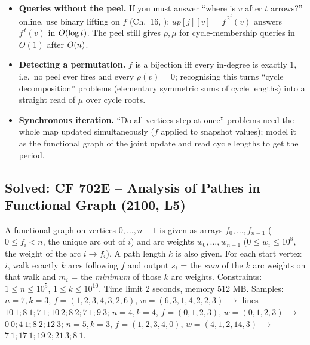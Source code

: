 \begin{hardeningbox}
\begin{itemize}[nosep,leftmargin=1.4em]
  \item \textbf{Queries without the peel.} If you must answer ``where is \(v\) after
        \(t\) arrows?'' online, use binary lifting on \(f\) (Ch.~16, ):
        \(\mathit{up}[j][v]=f^{\,2^j}(v)\) answers \(f^{\,t}(v)\) in
        \(O(\log t)\).  The peel still gives \(\rho,\mu\) for cycle-membership
        queries in \(O(1)\) after \(O(n)\).
  \item \textbf{Detecting a permutation.} \(f\) is a bijection iff every in-degree is
        exactly \(1\), i.e.\ no peel ever fires and every \(\rho(v)=0\); recognising
        this turns ``cycle decomposition'' problems (elementary symmetric sums of
        cycle lengths) into a straight read of \(\mu\) over cycle roots.
  \item \textbf{Synchronous iteration.} ``Do all vertices step at once'' problems need
        the whole map updated simultaneously (\(f\) applied to snapshot values); model
        it as the functional graph of the joint update and read cycle lengths to get
        the period.
\end{itemize}
\end{hardeningbox}

\subsection{Solved: CF 702E -- Analysis of Pathes in Functional Graph (2100, L5)}


\begin{problemstatement}
A functional graph on vertices \(0,\dots,n-1\) is given as arrays \(f_0,\dots,f_{n-1}\)
(\(0\le f_i<n\), the unique arc out of \(i\)) and arc weights \(w_0,\dots,w_{n-1}\)
(\(0\le w_i\le 10^8\), the weight of the arc \(i\to f_i\)).  A path length \(k\) is
also given.  For each start vertex \(i\), walk exactly \(k\) arcs following \(f\) and
output \(s_i\) = the \emph{sum} of the \(k\) arc weights on that walk and \(m_i\) =
the \emph{minimum} of those \(k\) arc weights.  Constraints: \(1\le n\le 10^5\),
\(1\le k\le 10^{10}\).  Time limit 2 seconds, memory 512 MB.  Samples:
\(n{=}7,k{=}3\), \(f=(1,2,3,4,3,2,6)\), \(w=(6,3,1,4,2,2,3)\) \(\to\) lines
\(10\ 1; 8\ 1; 7\ 1; 10\ 2; 8\ 2; 7\ 1; 9\ 3\); \(n{=}4,k{=}4\),
\(f=(0,1,2,3)\), \(w=(0,1,2,3)\) \(\to\) \(0\ 0; 4\ 1; 8\ 2; 12\ 3\);
\(n{=}5,k{=}3\), \(f=(1,2,3,4,0)\), \(w=(4,1,2,14,3)\) \(\to\) \(7\ 1; 17\ 1; 19\ 2;
21\ 3; 8\ 1\).
\end{problemstatement}

